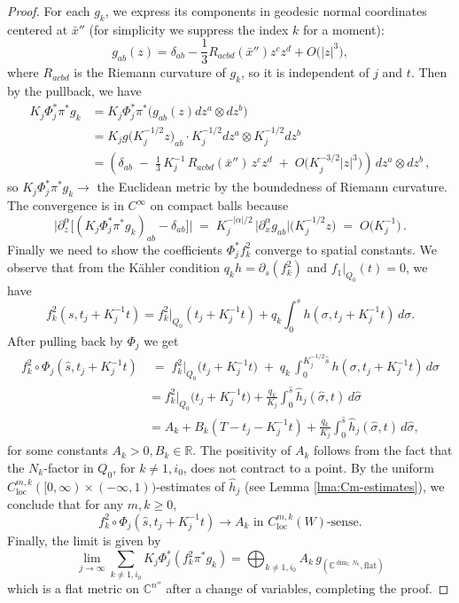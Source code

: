 \documentclass[11pt]{amsart}
\theoremstyle{plain}
\numberwithin{equation}{section}
\theoremstyle{definition}
\theoremstyle{remark}
\begin{document}
\begin{proof}
For each $g_k$, we express its components in geodesic normal coordinates centered at $\bar{x}''$ (for simplicity we suppress the index $k$ for a moment):
\[g_{ab}(z) = \delta_{ab} - \frac{1}{3}R_{acbd}(\bar{x}'')z^cz^d + O\big(|z|^3\big),\]
where $R_{acbd}$ is the Riemann curvature of $g_k$, so it is independent of $j$ and $t$. Then by the pullback, we have
\begin{align*}
K_j\Phi_j^*\pi^*g_k & = K_j\Phi_j^*\pi^*\big(g_{a b}(z)dz^a \otimes dz^b\big)\\
& = K_jg\big( K_j^{-1/2} z \big)_{ab} \cdot K_j^{-1/2}dz^a \otimes K_j^{-1/2}dz^b\\
& =\left(\delta_{a b} \;-\; \tfrac{1}{3} \, K_j^{-1} \, R_{a c b d} ( \bar{x}'' ) \, z^c z^d \;+\; O \big( K_j^{-3/2} | z |^3 \big)\right)\,dz^a \otimes dz^b\,,
\end{align*}
so $K_j \Phi_j^*\pi^*g_k \to$ the Euclidean metric by the boundedness of Riemann curvature. The convergence is in $C^\infty$ on compact balls because
\[\big|\partial_z^\alpha\big[(K_j\Phi_j^*\pi^* g_k)_{ab} - \delta_{ab}\big]\big| \;=\; K_j^{-|\alpha|/2}\,\big|\partial_x^\alpha g_{ab}\big|\big(K_j^{-1/2}z\big) \;=\; O\big(K_j^{-1}\big) \,.\]
Finally we need to show the coefficients $\Phi_j^*f_k^2$ converge to spatial constants. We observe that from the K\"ahler condition $q_k h = \partial_s(f_k^2)$ and $f_1\big|_{Q_0}(t) = 0$, we have 
\[f_k^2(s, t_j + K_j^{-1}t) = f_k^2\big|_{Q_0} (t_j + K_j^{-1}t) +q_k \int_0^s h(\sigma,t_j+K_j^{-1}t)\,d\sigma.\]
After pulling back by $\Phi_j$ we get
\begin{align*}
f_k^2 \circ \Phi_j (\hat{s},t_j+K_j^{-1}t) & \;=\; f_k^2 \big|_{Q_0} \big( t_j + K_j^{-1} t \big) \;+\; q_k \, \int_0^{K_j^{-1/2}\hat{s}}h(\sigma,t_j+K_j^{-1}t)\,d\sigma\\
& = f_k^2 \big|_{Q_0} \big( t_j + K_j^{-1} t \big) + \frac{q_k}{K_j}\int_0^{\hat{s}}\hat{h}_j(\hat\sigma, t)\,d\hat\sigma\\
& = A_k + B_k (T-t_j - K_j^{-1}t) + \frac{q_k}{K_j}\int_0^{\hat{s}}\hat{h}_j(\hat\sigma, t)\,d\hat\sigma,
\end{align*}
for some constants $A_k > 0, B_k \in \mathbb{R}$. The positivity of $A_k$ follows from the fact that the $N_k$-factor in $Q_0$, for $k \not=1,i_0$, does not contract to a point. By the uniform $C^{m,k}_{\textrm{loc}}([0,\infty) \times (-\infty,1))$-estimates of $\hat{h}_j$ (see Lemma \ref{lma:Cm-estimates}), we conclude that for any $m, k \geq 0$,
\[f_k^2 \circ \Phi_j(\hat{s},t_j+K_j^{-1}t) \to A_k \text{ in $C^{m,k}_{\textrm{loc}}(W)$-sense}.\]
Finally, the limit is given by
\[\lim_{j\to\infty} \sum_{k\not=1,i_0}K_j\Phi_j^*(f_k^2\pi^*g_k) = \bigoplus_{k\not=1,i_0}A_k\,g_{(\mathbb{C}^{\dim_{\mathbb{C}}N_k}, \text{flat})}\]
which is a flat metric on $\mathbb{C}^{n''}$ after a change of variables, completing the proof.
\end{proof}
\end{document}
